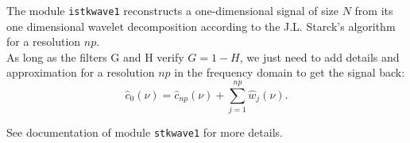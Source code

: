 The module {\tt istkwave1} reconstructs a one-dimensional signal of size $N$ from its one dimensional wavelet decomposition according to the J.L. Starck's algorithm~\cite{starck.bijaoui.ea:image} for a resolution $np$.\\
As long as the filters G and H verify $G=1-H$, we just need to add details and approximation for a resolution $np$ in the frequency domain to get the signal back:\\
$$ \hat{c}_0(\nu)=\hat{c}_{np}(\nu)+\sum_{j=1}^{np}\hat{w}_j(\nu).$$

See documentation of module {\tt stkwave1} for more details.
